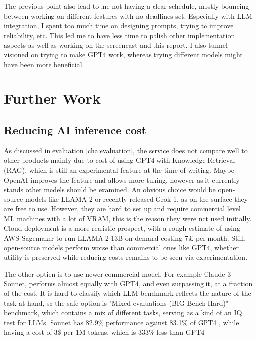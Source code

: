 The previous point also lead to me not having a clear schedule, mostly bouncing between working on different features with no deadlines set. Especially with LLM integration, I spent too much time on designing prompts, trying to improve reliability, etc. This led me to have less time to polish other implementation aspects as well as working on the screencast and this report. I also tunnel-visioned on trying to make GPT4 work, whereas trying different models might have been more beneficial. 
\section{Further Work}
\subsection{Reducing AI inference cost}
\label{subsec:tryingOther}
As discussed in evaluation \ref{cha:evaluation}, the service does not compare well to other products mainly due to cost of using GPT4 with Knowledge Retrieval (RAG), which is still an experimental feature at the time of writing. Maybe OpenAI improves the feature and allows more tuning, however as it currently stands other models should be examined. An obvious choice would be open-source models like LLAMA-2 or recently released Grok-1, as on the surface they are free to use. However, they are hard to set up and require commercial level ML machines with a lot of VRAM, this is the reason they were not used initially. Cloud deployment is a more realistic prospect, with a rough estimate of using AWS Sagemaker to run LLAMA-2-13B on demand costing 7£ per month. Still, open-source models perform worse than commercial ones like GPT4, whether utility is preserved while reducing costs remains to be seen via experimentation.

The other option is to use newer commercial model. For example Claude 3 Sonnet, performs almost equally with GPT4, and even surpassing it, at a fraction of the cost. It is hard to classify which LLM benchmark reflects the nature of the task at hand, so the safe option is "Mixed evaluations (BIG-Bench-Hard)" benchmark, which contains a mix of different tasks, serving as a kind of an IQ test for LLMs. Sonnet has 82.9\% performance against 83.1\% of GPT4 \cite{claude3Bench}, while having a cost of 3\$ per 1M tokens, which is 333\% less than GPT4.

